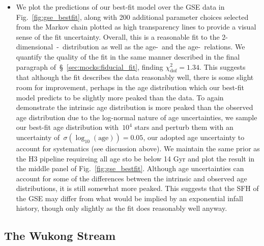 \documentclass[ms.tex]{subfiles}
\begin{document}
\begin{itemize}
	\item We plot the predictions of our best-fit model over the GSE data in
	Fig.~\ref{fig:gse_bestfit}, along with 200 additional parameter choices
	selected from the Markov chain plotted as high transparency lines to
	provide a visual sense of the fit uncertainty.
	Overall, this is a reasonable fit to the
	2-dimensional~\afe-\feh~distribution as well as the age-\feh~and the
	age-\afe~relations.
	We quantify the quality of the fit in the same manner described in the
	final paragraph of~\S~\ref{sec:mocks:fiducial_fit}, finding
	$\chi_\text{dof}^2 = 1.34$.
	This suggests that although the fit describes the data reasonably well,
	there is some slight room for improvement, perhaps in the age distribution
	which our best-fit model predicts to be slightly more peaked than the data.
	To again demonstrate the intrinsic age distribution is more peaked than the
	observed age distribution due to the log-normal nature of age uncertainties,
	we sample our best-fit age distribution with~$10^4$ stars and perturb them
	with an uncertainty of~$\sigma(\log_{10}(\text{age})) = 0.05$, our adopted
	age uncertainty to account for systematics (see discussion above).
	We maintain the same prior as the H3 pipeline requireing all age sto be
	below 14 Gyr and plot the result in the middle panel of
	Fig.~\ref{fig:gse_bestfit}.
	Although age uncertainties can account for some of the differences between
	the intrinsic and observed age distributions, it is still somewhat more
	peaked.
	This suggests that the SFH of the GSE may differ from what would be implied
	by an exponential infall history, though only slightly as the fit does
	reasonably well anyway.

\end{itemize}

\subsection{The Wukong Stream}
\label{sec:h3:wukong}
\end{document}
